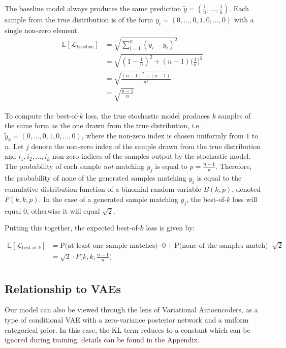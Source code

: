 \documentclass{article}
\begin{document}
The baseline model always produces the same prediction $\tilde{y} = (\frac{1}{n}, ..., \frac{1}{n})$. Each sample from the true distribution is of the form $y_i = (0, ..., 0, 1, 0, ..., 0)$ with a single non-zero element.
\begin{align*}
  \mathbb{E}[\mathcal{L}_{\mbox{baseline}}] &= \sqrt{\sum_{i=1}^n (\tilde{y}_i - y_i)^2} \\
  &= \sqrt{(1-\frac{1}{n})^2 + (n-1)\Big ( \frac{1}{n} \Big )^2} \\
  &= \sqrt{\frac{(n-1)^2 + (n-1)}{n^2}} \\
  &= \sqrt{\frac{n-1}{n}}
\end{align*}

To compute the best-of-$k$ loss, the true stochastic model produces $k$ samples of the same form as the one drawn from the true distribution, i.e. $\tilde{y}_k = (0, ..., 0, 1, 0, ..., 0)$, where the non-zero index is chosen uniformly from $1$ to $n$.
Let $j$ denote the non-zero index of the sample drawn from the true distribution and $i_1, i_2, ..., i_k$ non-zero indices of the samples output by the stochastic model.
The probability of each sample \textit{not} matching $y_j$ is equal to $p=\frac{n-1}{n}$.
Therefore, the probability of none of the generated samples matching $y_j$ is equal to the cumulative distribution function of a binomial random variable $B(k, p)$, denoted $F(k, k, p)$.
In the case of a generated sample matching $y_j$, the best-of-$k$ loss will equal 0, otherwise it will equal $\sqrt{2}$.

Putting this together, the expected best-of-$k$ loss is given by:

\begin{align*}
  \mathbb{E}[\mathcal{L}_{\mbox{best-of-$k$}}] &= \mbox{P(at least one sample matches)}\cdot 0 + \mbox{P(none of the samples match)} \cdot \sqrt{2} \\
  &= \sqrt{2} \cdot F\Big (k, k, \frac{n-1}{n} \Big) \\
\end{align*}

\subsection{Relationship to VAEs}

Our model can also be viewed through the lens of Variational Autoencoders, as a type of conditional VAE with a zero-variance posterior network and a uniform categorical prior.
In this case, the KL term reduces to a constant which can be ignored during training; details can be found in the Appendix.
\end{document}
